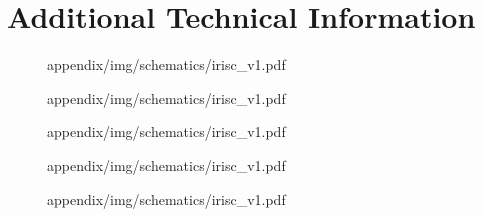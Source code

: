 \newpage
\section{Additional Technical Information}\label{sec:appC}

\begin{figure}[h!]
	{appendix/img/schematics/irisc_v1.pdf}
\end{figure}
\newpage
\begin{figure}[h!]
		{appendix/img/schematics/irisc_v1.pdf}
\end{figure}
\newpage
\begin{figure}[h!]
		{appendix/img/schematics/irisc_v1.pdf}
\end{figure}
\newpage
\begin{figure}[h!]
		{appendix/img/schematics/irisc_v1.pdf}
\end{figure}
\newpage
\begin{figure}[h!]
		{appendix/img/schematics/irisc_v1.pdf}
\end{figure}



% 
% 
% 
% 
% 




% 

% 
% 
% 

